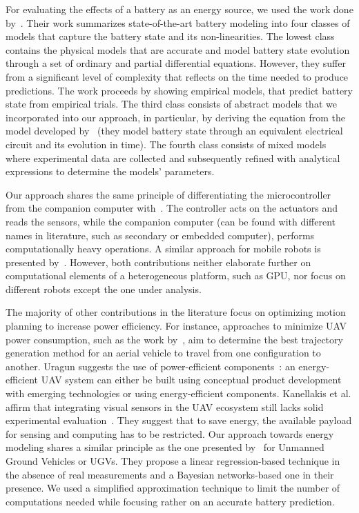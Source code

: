 For evaluating the effects of a battery as an energy source, we used the work done by~\citep{rao2003battery}. Their work summarizes state-of-the-art battery modeling into four classes of models that capture the battery state and its non-linearities. The lowest class contains the physical models that are accurate and model battery state evolution through a set of ordinary and partial differential equations. However, they suffer from a significant level of complexity that reflects on the time needed to produce predictions. The work proceeds by showing empirical models, that predict battery state from empirical trials. The third class consists of abstract models that we incorporated into our approach, in particular, by deriving the equation from the model developed by~\citep{hasan2018exogenous} (they model battery state through an equivalent electrical circuit and its evolution in time). The fourth class consists of mixed models where experimental data are collected and subsequently refined with analytical expressions to determine the models' parameters.


Our approach shares the same principle of differentiating the microcontroller from the companion computer with~\citep{mei2004energy, mei2005case}. The controller acts on the actuators and reads the sensors, while the companion computer (can be found with different names in literature, such as secondary or embedded computer), performs computationally heavy operations. A similar approach for mobile robots is presented by~\citep{dressler2005energy}. However, both contributions neither elaborate further on computational elements of a heterogeneous platform, such as GPU, nor focus on different robots except the one under analysis.

The majority of other contributions in the literature focus on optimizing motion planning to increase power efficiency. For instance, approaches to minimize UAV power consumption, such as the work by~\citep{kreciglowa2017energy}, aim to determine the best trajectory generation method for an aerial vehicle to travel from one configuration to another. Uragun suggests the use of power-efficient components~\citep{uragun2011energy}: an energy-efficient UAV system can either be built using conceptual product development with emerging technologies or using energy-efficient components. Kanellakis et al. affirm that integrating visual sensors in the UAV ecosystem still lacks solid experimental evaluation~\citep{kanellakis2017survey}. They suggest that to save energy, the available payload for sensing and computing has to be restricted. Our approach towards energy modeling shares a similar principle as the one presented by~\citep{sadrpour2013mission, sadrpour2013experimental} for Unmanned Ground Vehicles or UGVs. They propose a linear regression-based technique in the absence of real measurements and a Bayesian networks-based one in their presence. We used a simplified approximation technique to limit the number of computations needed while focusing rather on an accurate battery prediction.

